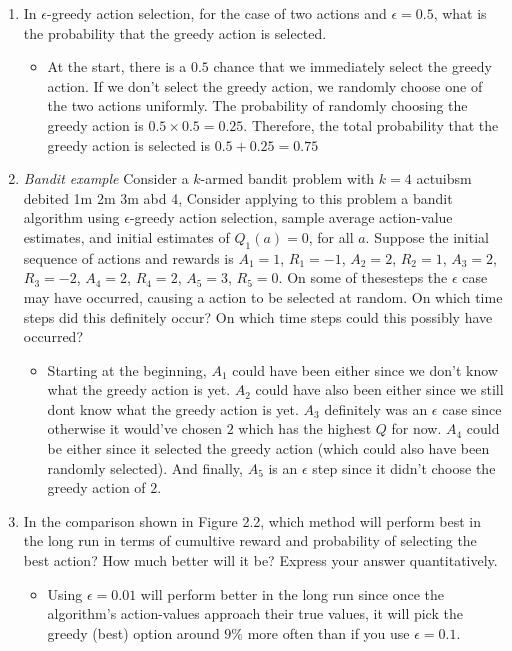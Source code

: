 \documentclass{article}
\begin{document}
\maketitle

\begin{enumerate}
    \item In $\epsilon$-greedy action selection, for the case of two actions and $\epsilon = 0.5$, what is the probability that the greedy action is selected.
    \begin{itemize}
        \item At the start, there is a $0.5$ chance that we immediately select the greedy action. If we don't select the greedy action, we randomly choose one of the two actions uniformly. The probability of randomly choosing the greedy action is $0.5 \times 0.5 = 0.25$. Therefore, the total probability that the greedy action is selected is $0.5 + 0.25 = 0.75$
    \end{itemize}

    \item \emph{Bandit example} Consider a $k$-armed bandit problem with $k=4$ actuibsm debited 1m 2m 3m abd 4, Consider applying to this problem a bandit algorithm using $\epsilon$-greedy action selection, sample average action-value estimates, and initial estimates of $Q_1(a) = 0$, for all $a$. Suppose the initial sequence of actions and rewards is $A_1 = 1$, $R_1 = -1$, $A_2 = 2$, $R_2 = 1$, $A_3 = 2$, $R_3 = -2$, $A_4 = 2$, $R_4 = 2$, $A_5 = 3$, $R_5 = 0$. On some of thesesteps the $\epsilon$ case may have occurred, causing a action to be selected at random. On which time steps did this definitely occur? On which time steps could this possibly have occurred?
    \begin{itemize}
        \item Starting at the beginning, $A_1$ could have been either since we don't know what the greedy action is yet. $A_2$ could have also been either since we still dont know what the greedy action is yet. $A_3$ definitely was an $\epsilon$ case since otherwise it would've chosen $2$ which has the highest $Q$ for now. $A_4$ could be either since it selected the greedy action (which could also have been randomly selected). And finally, $A_5$ is an $\epsilon$ step since it didn't choose the greedy action of $2$.
    \end{itemize}

    \item In the comparison shown in Figure 2.2, which method will perform best in the long run in terms of cumultive reward and probability of selecting the best action? How much better will it be? Express your answer quantitatively.
    \begin{itemize}
        \item Using $\epsilon=0.01$ will perform better in the long run since once the algorithm's action-values approach their true values, it will pick the greedy (best) option around $9\%$ more often than if you use $\epsilon=0.1$.
    \end{itemize}


\end{enumerate}
\end{document}
